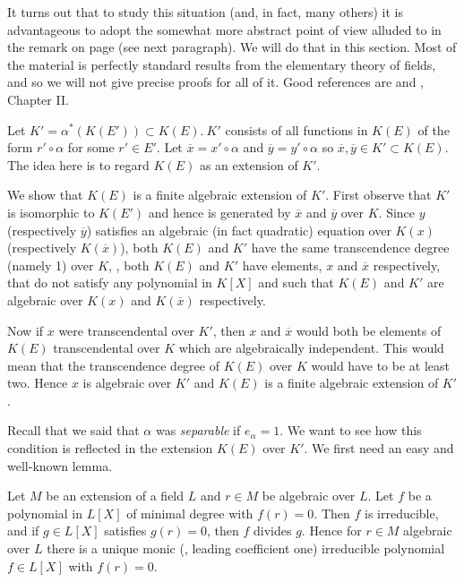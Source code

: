 It turns out that to study this situation (and, in fact, many others) it is advantageous to adopt the somewhat more abstract point of view alluded to in the remark on page \pageref{specialremark} (see next paragraph). We will do that in this section. Most of the material is perfectly standard results from the elementary theory of fields, and so we will not give precise proofs for all of it. Good references are \cite{r2.1} and \cite{r2.17}, Chapter II.

Let $K'=\alpha^{*}(K(E'))\subset K(E).\ K'$ consists of all functions in $K(E)$ of the form $ r'\circ\alpha$ for some $r'\in E'$. Let $\overline{x}=x'\circ\alpha$ and $\overline{y}=y'\circ\alpha$ so $\overline{x},\overline{y}\in K'\subset K(E)$. The idea here is to regard $K(E)$ as an extension of $K'$.


We show that $K(E)$ is a finite algebraic extension of $K'$. First observe that $K'$ is isomorphic to $K(E')$ and hence is generated by $\overline{x}$ and $\overline{y}$ over $K$. Since $y$ (respectively $\overline{y}$) satisfies an algebraic (in fact quadratic) equation over $K(x)$ (respectively $K(\overline{x})$), both $K(E)$ and $K'$ have the same transcendence degree (namely 1) over $K$, \ie, both $K(E)$ and $K'$ have elements, $x$ and $\overline{x}$ respectively, that do not satisfy any polynomial in $K[X]$ and such that $K(E)$ and $K'$ are algebraic over $K(x)$ and $K(\overline{x})$ respectively.

Now if $x$ were transcendental over $K'$, then $x$ and $\overline{x}$ would both be elements of $K(E)$ transcendental over $K$ which are algebraically independent. This would mean that the transcendence degree of $K(E)$ over $K$ would have to be at least two. Hence $x$ is algebraic over $K'$ and $K(E)$ is a finite algebraic extension of $K'$.

Recall that we said that $\alpha$ was {\it separable} if $e_{\alpha}=1$. We want to see how this condition is reflected in the extension $K(E)$ over $K'$. We first need an easy and well-known lemma.

\begin{lem}
\label{l2.3.1}
Let $M$ be an extension of a field $L$ and $r\in M$ be algebraic over $L$. Let $f$ be a polynomial in $L[X]$ of minimal degree with $f(r)=0$. Then $f$ is irreducible, and if $g\in L[X]$ satisfies $g(r)=0$, then $f$ divides $g$. Hence for $r\in M$ algebraic over $L$ there is a unique monic (\ie, leading coefficient one) irreducible polynomial $f\in L[X]$ with $f(r)=0$.
\end{lem}

